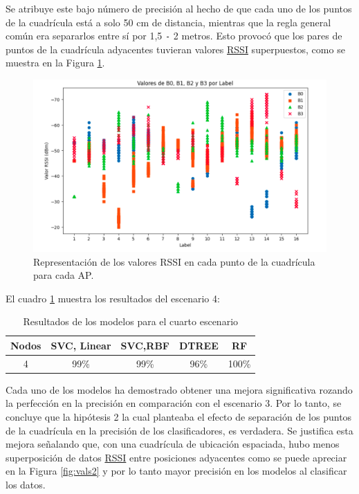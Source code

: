 Se atribuye este bajo número de precisión al hecho de que cada uno de los puntos de la cuadrícula está a solo 50 cm de distancia, mientras que la regla general común era separarlos entre sí por 1,5 \texttt{-} 2 metros. Esto provocó que los pares de puntos de la cuadrícula adyacentes tuvieran valores \hyperlink{RSSI}{RSSI} superpuestos, como se muestra en la Figura \ref{fig:vals1}.



\begin{figure}[H]
  \centering
  \includegraphics[scale=0.4]{figs/vals1} %
  \caption{ Representación de los valores RSSI en cada punto de la cuadrícula para cada AP.}
  \label{fig:vals1}
\end{figure} 

El cuadro \ref{cuadro:tabla3} muestra los resultados del escenario 4:

\begin{table}[H]
\begin{center}
\begin{tabular}{|c|c|c|c|c|}
\hline
\textbf{Nodos} & \textbf{SVC, Linear} & \textbf{SVC,RBF} & \textbf{DTREE} & \textbf{RF} \\
\hline
4 & 99\% & 99\% & 96\% & 100\% \\  
\hline
\end{tabular}
\caption{Resultados de los modelos para el cuarto escenario}
\label{cuadro:tabla3}
\end{center}
\end{table}


Cada uno de los modelos ha demostrado obtener una mejora significativa rozando la perfección en la precisión en comparación con el escenario 3. Por lo tanto, se concluye que la hipótesis 2 la cual planteaba el efecto de separación de los puntos de la cuadrícula en la precisión de los clasificadores, es verdadera. Se justifica esta mejora señalando que, con una cuadrícula de ubicación espaciada, hubo menos superposición de datos \hyperlink{RSSI}{RSSI} entre posiciones adyacentes como se puede apreciar en la Figura \ref{fig:vals2} y por lo tanto mayor precisión en los modelos al clasificar los datos.

